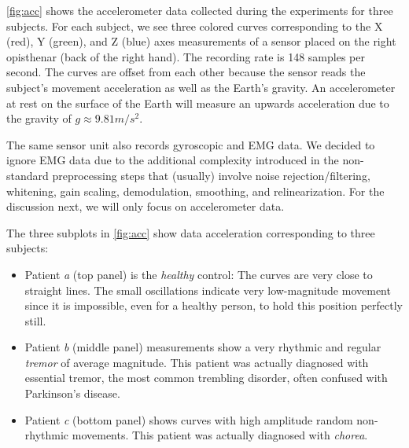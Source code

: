 \cref{fig:acc} shows the accelerometer data collected during the experiments for three subjects. For each subject, we see three colored curves corresponding to the X (red), Y (green), and Z (blue) axes measurements of a sensor placed on the right opisthenar (back of the right hand). The recording rate is 148 samples per second. The curves are offset from each other because the sensor reads the subject's movement acceleration as well as the Earth's gravity. An accelerometer at rest on the surface of the Earth will measure an upwards acceleration due to the gravity of $g \approx 9.81 m/s^2$. 

The same sensor unit also records gyroscopic and EMG data. We decided to ignore EMG data due to the additional complexity introduced in the non-standard preprocessing steps that (usually) involve noise rejection/filtering, whitening, gain scaling, demodulation, smoothing, and relinearization. For the  discussion next, we will only focus on accelerometer data.

The three subplots in \cref{fig:acc} show data acceleration corresponding to three subjects: 
\begin{itemize}
  \item Patient \textit{a} (top panel) is the \emph{healthy} control: The curves are very close to straight lines. The small oscillations indicate very low-magnitude movement since it is impossible, even for a healthy person, to hold this position perfectly still.
  \item Patient \textit{b} (middle panel) measurements show a very rhythmic and regular \emph{tremor} of average magnitude. This patient was actually diagnosed with essential tremor, the most common trembling disorder, often confused with Parkinson's disease.
  \item Patient \textit{c} (bottom panel) shows curves with high amplitude random non-rhythmic movements. This patient was actually diagnosed with \emph{chorea}. 
\end{itemize}
 

